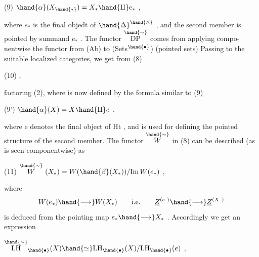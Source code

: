 
(9) \qquad $\hand{\alpha}(X_{\hand{*}}) = X_* \hand{\amalg} e_*$ \qquad ,

where $e_*$ is the  final objedt of $\hand{\Delta}^{\hand{\wedge}}$ , and the second member is
pointed by  summand $e_*$ . The functor $\overset{\hand{\sim}}{\mathrm{DP}}$ comes from applying compo-%
nentwise the  functor from (Ab) to (Sets$^\hand{\bullet}$) (pointed sets)  Passing to
the suitable localized categories, we get from (8)

(10)  \qquad ,

factoring (2), where \hand{$\alpha$} is now defined by the formula similar to (9)

(9') \qquad $\hand{\alpha}(X) = X \hand{\amalg} e$ \quad ,

where e denotes the final object of Ht , and is used for defining the
pointed structure of the second member. The functor $\overset{\hand{\sim}}{W}$ in (8) can be
described (as is seen componentwise) as

(11) \qquad $\overset{\hand{\sim}}{W}\ (X_*) = W(\hand{\beta}(X_*))/ \mathrm{Im}\, W(e_*)$ \quad ,

where
\[ W(e_*) \hand{\longrightarrow} W(X_*) \qquad \text{i.e.} \qquad \underline{Z}^{(e\ )} \hand{\longrightarrow} \underline{Z}^{(X\ )} \]
is deduced from the pointing map $e_* \hand{\longrightarrow} X_*$ . Accordingly we get
an expression

 \qquad $\overset{\hand{\sim}}{\mathrm{LH}}_{\hand{\bullet}}(X) \hand{\simeq} \mathrm{LH}_{\hand{\bullet}}(X)/\mathrm{LH}_{\hand{\bullet}}(e)$ \qquad ,

